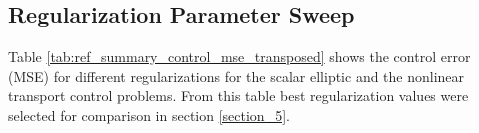 \documentclass[final,1p,times]{elsarticle}
\theoremstyle{plain} %
\theoremstyle{definition} %
\theoremstyle{remark} %
\begin{document}
\subsection{Regularization Parameter Sweep}\label{appendix_b_regularization}
Table \ref{tab:ref_summary_control_mse_transposed} shows the control error (MSE) for different regularizations for the scalar elliptic and the nonlinear transport control problems. From this table best regularization values were selected for comparison in section \ref{section_5}.
\begin{table}[h]
\centering
\scriptsize
\caption{Control error (MSE) for $L_2$ and $H^1$ regularization across the scalar elliptic control and the nonlinear transport control problems for different regularization parameters. For each problem, the best result is bolded separately within the $L_2$ block and within the $H^1$ block.}
\label{tab:ref_summary_control_mse_transposed}
\renewcommand{\arraystretch}{1.15}
\setlength{\tabcolsep}{4pt}


\end{table}
\end{document}
